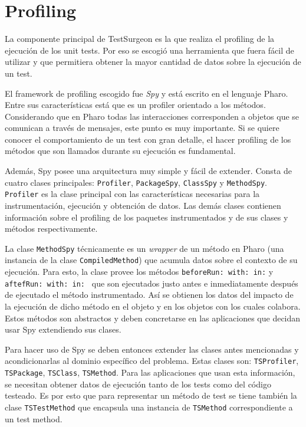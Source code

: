 \section{Profiling}
 
\par La componente principal de TestSurgeon es la que realiza el profiling  de la ejecución de los unit tests. Por eso se escogió una herramienta que fuera fácil de utilizar y que permitiera obtener la mayor cantidad de datos sobre la ejecución de un test.
\par El framework de profiling escogido fue \emph{Spy} y está escrito en el lenguaje Pharo. Entre sus características está que es un profiler orientado a los métodos. Considerando que en Pharo todas las interacciones corresponden a objetos que se comunican a través de mensajes, este punto es muy importante. Si se quiere conocer el comportamiento de un test con gran detalle, el hacer profiling de los métodos que son llamados durante su ejecución es fundamental. 

\par Además, Spy posee una arquitectura muy simple y fácil de extender. Consta de cuatro clases principales: {\tt Profiler}, {\tt PackageSpy}, {\tt ClassSpy} y {\tt MethodSpy}. {\tt Profiler} es la clase principal con las características necesarias para la instrumentación, ejecución y obtención de datos. Las demás clases contienen información sobre el profiling de los paquetes instrumentados y de sus clases y métodos respectivamente. 

\par La clase {\tt MethodSpy} técnicamente es un \emph{wrapper} de un método en Pharo (una instancia de la clase {\tt CompiledMethod}) que acumula datos sobre el contexto de su ejecución. Para esto, la clase provee los métodos {\tt beforeRun: with: in:} y {\tt aftefRun: with: in: } que son ejecutados justo antes e inmediatamente después de ejecutado el método instrumentado. Así se obtienen los datos del impacto de la ejecución de dicho método en el objeto y en los objetos con los cuales colabora. Estos métodos son abstractos y deben concretarse en las aplicaciones que decidan usar Spy extendiendo sus clases. 


\par Para hacer uso de Spy se deben entonces extender las clases antes mencionadas y acondicionarlas al dominio específico del problema. Estas clases son: {\tt TSProfiler}, {\tt TSPackage}, {\tt TSClass}, {\tt TSMethod}. Para las aplicaciones que usan esta información, se necesitan obtener datos de ejecución tanto de los tests como del código testeado. Es por esto que para representar un método de test se tiene también la clase {\tt TSTestMethod} que encapsula una instancia de {\tt TSMethod} correspondiente a un test method.

